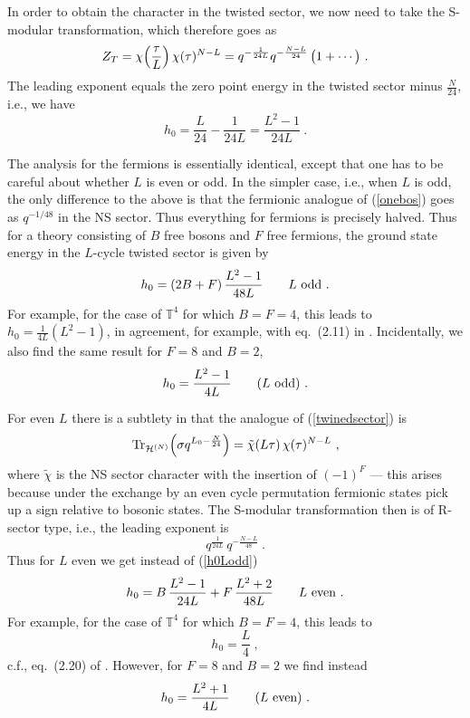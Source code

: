 \documentclass[12pt,a4paper]{article}
\newcommand{\be}{ \begin{equation}}
\newcommand{\ee}{\end{equation}}
\begin{document}
In order to obtain the character in the twisted sector, we now need to take the S-modular transformation, 
which therefore goes as 
\begin{equation}
Z_T = \chi \Bigl(\frac{\tau}{L}\Bigr)\, \chi(\tau)^{N-L}  = q^{-\frac{1}{24 L}} q^{-\frac{N-L}{24}}\, \bigl( 1 + \cdots \bigr) \ .
\end{equation}
The leading exponent equals the zero point energy in the twisted sector minus $\tfrac{N}{24}$, i.e., 
we have
\begin{equation}\label{zerob}
h_0 =  \frac{L}{24} - \frac{1}{24 L}  = \frac{L^2-1}{24 L} \ . 
\end{equation}
\smallskip

The analysis for the fermions is essentially identical, except that one has to be careful about whether
$L$ is even or odd. In the simpler case, i.e., when $L$ is odd, the only difference to the above is that the 
fermionic analogue of (\ref{onebos}) goes as $q^{-1/48}$ in the NS sector. Thus everything for fermions
is precisely halved. Thus for a theory consisting of $B$ free bosons and $F$ free fermions, the ground state energy in the  $L$-cycle twisted sector is given by 
\be\label{h0Lodd}
h_0 = (2 B + F) \,  \frac{L^2-1}{48 L}  \qquad \hbox{$L$ odd} \ . 
\ee
For example, for the case of $\mathbb{T}^4$ for which $B=F=4$, this leads to $h_0 = \frac{1}{4L} (L^2-1)$, in agreement, for example, 
with eq.\ (2.11) in   \cite{Lunin:2001pw}. Incidentally, we also find the same result for $F=8$ and $B=2$, 
\be\label{Loddground}
h_0 = \frac{L^2-1}{4L} \qquad \hbox{($L$ odd)}  \ .
\ee
\medskip

\noindent For even $L$ there is a subtlety in that the analogue of (\ref{twinedsector}) is 
\begin{equation}\label{twinedsectorp}
{\rm Tr}_{{\cal H}^{(N)}} \Bigl(\sigma q^{L_0 - \frac{N}{24}} \Bigr) = \tilde\chi(L\tau)\, \chi(\tau)^{N-L} \ ,
\end{equation}
where $\tilde\chi$ is the NS sector character with the insertion of $(-1)^F$ --- this arises because under the exchange by an even cycle permutation fermionic states pick up a sign relative to bosonic states. The S-modular transformation then is of R-sector type, i.e., the leading exponent is 
\be
q^{\frac{1}{24 L}} \, q^{-\frac{N-L}{48}} \ .
\ee
Thus for $L$ even we get instead of (\ref{h0Lodd})
\be
h_0 = B\, \frac{L^2-1}{24 L} + F \, \frac{L^2+2}{48 L} 
\qquad \hbox{$L$ even} \ . 
\ee
For example, for the case of $\mathbb{T}^4$ for which $B=F=4$, this leads to 
\be\label{LevenT4}
h_0 = \frac{L}{4} \ , 
\ee
c.f.,  eq.~(2.20) of \cite{Lunin:2001pw}. 
However, for $F=8$ and $B=2$ we find instead 
\be\label{Levenground}
h_0 = \frac{L^2+1}{4L} \qquad \hbox{($L$ even)}  \ .
\ee
\end{document}
